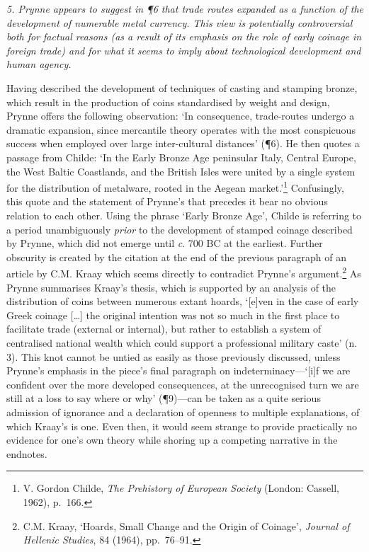 \documentclass[]{article}
\begin{document}
\emph{5. Prynne appears to suggest in ¶6 that trade routes expanded as a
function of the development of numerable metal currency. This view is
potentially controversial both for factual reasons (as a result of its
emphasis on the role of early coinage in foreign trade) and for what it
seems to imply about technological development and human agency.}

Having described the development of techniques of casting and stamping
bronze, which result in the production of coins standardised by weight
and design, Prynne offers the following observation: ‘In consequence,
trade-routes undergo a dramatic expansion, since mercantile theory
operates with the most conspicuous success when employed over large
inter-cultural distances’ (¶6). He then quotes a passage from Childe:
‘In the Early Bronze Age peninsular Italy, Central Europe, the West
Baltic Coastlands, and the British Isles were united by a single system
for the distribution of metalware, rooted in the Aegean
market.’\footnote{V. Gordon Childe, \emph{The Prehistory of European
  Society} (London: Cassell, 1962), p.~166.} Confusingly, this quote and
the statement of Prynne’s that precedes it bear no obvious relation to
each other. Using the phrase ‘Early Bronze Age’, Childe is referring to
a period unambiguously \emph{prior} to the development of stamped
coinage described by Prynne, which did not emerge until \emph{c}. 700 BC
at the earliest. Further obscurity is created by the citation at the end
of the previous paragraph of an article by C.M. Kraay which seems
directly to contradict Prynne’s argument.\footnote{C.M. Kraay, ‘Hoards,
  Small Change and the Origin of Coinage’, \emph{Journal of Hellenic
  Studies}, 84 (1964), pp.~76–91.} As Prynne summarises Kraay’s thesis,
which is supported by an analysis of the distribution of coins between
numerous extant hoards, ‘{[}e{]}ven in the case of early Greek coinage
{[}\ldots{}{]} the original intention was not so much in the first place
to facilitate trade (external or internal), but rather to establish a
system of centralised national wealth which could support a professional
military caste’ (n. 3). This knot cannot be untied as easily as those
previously discussed, unless Prynne’s emphasis in the piece’s final
paragraph on indeterminacy—‘{[}i{]}f we are confident over the more
developed consequences, at the unrecognised turn we are still at a loss
to say where or why’ (¶9)—can be taken as a quite serious admission of
ignorance and a declaration of openness to multiple explanations, of
which Kraay’s is one. Even then, it would seem strange to provide
practically no evidence for one’s own theory while shoring up a
competing narrative in the endnotes.
\end{document}
